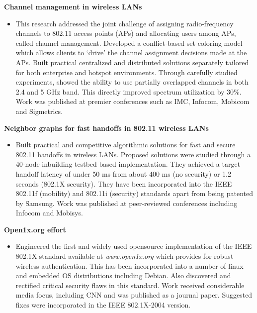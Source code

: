 \begin{resume}
{\bf Channel management in wireless LANs}
    \begin{itemize}
	\item [] This research addressed the joint challenge of assigning
	radio-frequency channels to 802.11 access points (APs) and allocating
	users among APs, called channel management. Developed a conflict-based set coloring model which allows clients to `drive' the channel assignment
decisions made at the APs.  Built practical centralized and distributed solutions separately tailored for both enterprise and hotspot
environments. Through carefully studied experiments, showed the ability to use partially overlapped channels in both 2.4
and 5 GHz band. This directly improved spectrum utilization by 30\%.  Work was published at premier conferences such as
IMC, Infocom, Mobicom and Sigmetrics.
    \end{itemize}
\vspace{-0.2cm}

{\bf Neighbor graphs for fast handoffs in 802.11 wireless LANs}
    \begin{itemize}
    \item []
  	Built practical and competitive algorithmic solutions for fast and secure 802.11 handoffs in wireless LANs.
       Proposed solutions were studied through a 40-node inbuilding testbed based implementation. They achieved 
       a target handoff latency of under 50 ms from about 400 ms (no security) or 1.2 seconds (802.1X security).
	They have been incorporated into the IEEE 802.11f (mobility) and 802.11i (security) standards apart from being
       patented by Samsung. Work was published at peer-reviewed conferences including Infocom and Mobisys.
    \end{itemize}
\vspace{-0.2cm}
{\bf Open1x.org effort}
    \begin{itemize}
	\item [] Engineered the first and widely used opensource implementation of the IEEE 802.1X standard available at
{\it www.open1x.org} which provides for robust wireless authentication. This has been incorporated into a number of linux
and embedded OS distributions including Debian. Also discovered and rectified critical security flaws in this standard. 
Work received considerable media focus, including CNN and was published as a journal paper. Suggested fixes were
incorporated in the IEEE 802.1X-2004 version.
    \end{itemize}



\end{resume}
